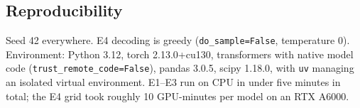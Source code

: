 \subsection{Reproducibility}

Seed 42 everywhere. E4 decoding is greedy (\texttt{do\_sample=False}, temperature 0). Environment:
Python 3.12, torch 2.13.0+cu130, transformers with native model code
(\texttt{trust\_remote\_code=False}), pandas 3.0.5, scipy 1.18.0, with \texttt{uv} managing an
isolated virtual environment. E1--E3 run on CPU in under five minutes in total; the E4 grid took
roughly 10 GPU-minutes per model on an RTX A6000.

